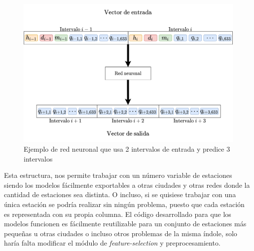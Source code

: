 \begin{figure}[H]
    \centering
    \includegraphics[width=14cm]{images/solution/preprocessing/models-design-2.png}
    \caption{Ejemplo de red neuronal que usa 2 intervalos de entrada y predice 3 intervalos}
        \label{fig:models-design-2}
\end{figure}



Esta estructura, nos permite trabajar con un número variable de estaciones siendo los modelos fácilmente exportables a otras ciudades y otras redes donde la cantidad de estaciones sea distinta. O incluso, si se quisiese trabajar con una única estación se podría realizar sin ningún problema, puesto que cada estación es representada con su propia columna. El código desarrollado para que los modelos funcionen es fácilmente reutilizable para un conjunto de estaciones más pequeñas u otras ciudades o incluso otros problemas de la misma índole, solo haría falta modificar el módulo de \textit{feature-selection} y preprocesamiento.